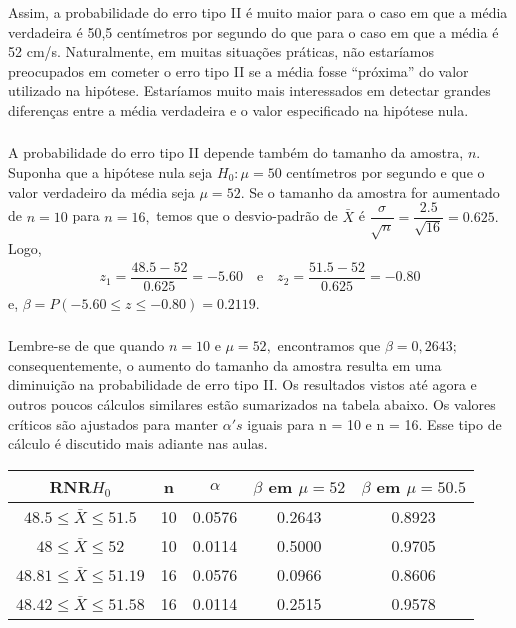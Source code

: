 \documentclass[14pt,aspectratio=1610]{beamer}
\newcommand{\Ho}{\ensuremath{H_{0}}}
\begin{document}
\begin{frame}{}
\frametitle{}
\begin{block}{}
\justifying
Assim, a probabilidade do erro tipo II é muito maior para o caso em que a média verdadeira é 50,5 centímetros por segundo do que para o caso em que a média é 
52 cm/s. Naturalmente, em muitas situações práticas, não estaríamos preocupados em cometer o erro tipo II se a média fosse “próxima” do valor utilizado na hipótese. 
Estaríamos muito mais interessados em detectar grandes diferenças entre a média verdadeira e o valor especificado na hipótese nula.
\end{block}
\end{frame}

\begin{frame}{}
\frametitle{}
\begin{block}{}
\justifying
A probabilidade do erro tipo II depende também do tamanho da amostra, $n.$ Suponha que a hipótese nula seja $\Ho: \mu = 50$ centímetros por segundo e que o valor 
verdadeiro da média seja $\mu = 52.$ Se o tamanho da amostra for aumentado de $n = 10$ para $n = 16,$ temos que o desvio-padrão de $\bar{X}$ é 
$\dfrac{\sigma}{\sqrt{n}}=\dfrac{2.5}{\sqrt{16}}=0.625.$ Logo,
\begin{align*}
z_{1}=\dfrac{48.5-52}{0.625}=-5.60\quad \textrm{e}\quad z_{2}=\dfrac{51.5-52}{0.625}=-0.80
\end{align*}
e, $\beta=P(-5.60\leq z\leq-0.80)=0.2119.$
\end{block}
\end{frame}

\begin{frame}{}
\frametitle{}
\begin{block}{}
\justifying
Lembre-se de que quando $n = 10$ e $\mu = 52,$ encontramos que $\beta = 0,2643;$ consequentemente, o aumento do tamanho da amostra resulta em uma diminuição 
na probabilidade de erro tipo II. Os resultados vistos até agora e outros poucos cálculos similares estão sumarizados na tabela abaixo. Os valores críticos são ajustados 
para manter $\alpha's$ iguais para n = 10 e n = 16. Esse tipo de cálculo é discutido mais adiante nas aulas.
\end{block}
\begin{table}[]
\begin{tabular}{|c|c|c|c|c|}
\hline
 RNR$\Ho$                                & n    & $\alpha$ & $\beta$ em $\mu=52$ & $\beta$ em $\mu=50.5$ \\ \hline
 $48.5\leq \bar{X}\leq 51.5$     & 10 & 0.0576 & 0.2643 & 0.8923 \\ \hline
 $48\leq \bar{X}\leq 52$           & 10 & 0.0114 & 0.5000 & 0.9705 \\ \hline
 $48.81\leq \bar{X}\leq 51.19$& 16 & 0.0576 & 0.0966 & 0.8606 \\ \hline
 $48.42\leq \bar{X}\leq 51.58$& 16 & 0.0114 & 0.2515 & 0.9578 \\ \hline
\end{tabular}
\end{table}

\end{frame}
\end{document}

